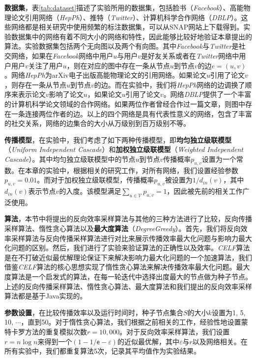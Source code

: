 \textbf{数据集}，表\ref{tab:dataset}描述了实验所用的数据集，包括脸书（\textit{Facebook}）、高能物理论文引用网络（\textit{HepPh}）、推特（\textit{Twitter}）、计算机科学合作网络（\textit{DBLP}）。这些网络都是相关研究中使用频繁的标注数据集，可以从SNAP网站上下载得到。实验数据集中的网络有着不同大小的网络和特性，因此能够比较好地验证本章提出的算法。实验数据集包括两个无向图以及两个有向图。其中\textit{Facebook}与\textit{Twitter}是社交网络，如果在\textit{Facebook}网络中用户$u$与用户$v$是好友关系或者在\textit{Twitter}网络中用户用户$v$关注了用户$u$，则在对应的图中存在一条从节点$u$到节点$v$的边$e=(u,v)$。网络\textit{HepPh}为arXiv电子出版高能物理论文的引用网络。如果论文$u$引用了论文$v$，则存在一条从节点$u$到节点$v$的边。而在实验中，我们将\textit{HepPh}网络的边调换了顺序来表示论文$v$影响了论文$u$，如果论文$u$引用了论文$v$。网络\textit{DBLP}提供了一个丰富的计算机科学论文领域的合作网络。如果两位作者曾经合作过一篇文章，则图中存在一条连接两位作者的边。以上的四个网络是具有代表性意义的网络，包含了丰富的社交关系，网络的边集合的大小从万级别到百万级别不等。

\textbf{传播模型}，在实验中，我们考虑了如下两种传播模型，即\textbf{均匀独立级联模型}（\textit{Uniform Independent Cascade}）和\textbf{加权独立级联模型}（\textit{Weighted Independent Cascade}）。其中均匀独立级联模型中的节点$u$到节点$v$传播概率$p_{u,v}$设置为一个常数。在本章的实验中，根据相关的研究工作，对所有网络，我们设置经验参数$p_{u,v}=0.01$。而对于加权独立级联模型，传播概率$p_{u,v}$被设置为$1 / d_{in}\left(v\right)$，其中$d_{in}\left(v\right)$表示节点$v$的入度。该模型满足$\sum_{u \in \mathcal{V}}{p_{u,v}} = 1$，因此被先前的相关工作广泛使用。

\textbf{算法}，本节中将提出的反向效率采样算法与其他的三种方法进行了比较，反向传播采样算法、惰性贪心算法以及\textbf{最大度算法}（\textit{DegreeGreedy}）。首先，我们将反向效率采样算法与反向传播采样算法进行对比来展示传播效率最大化问题与影响力最大化问题的区别。然后，我们进行了实验来验证算法的正确性以及效率。\textit{CELF}算法是在不打破近似最优解理论保证下来解决影响力最大化问题的一个加速算法，我们借鉴\textit{CELF}算法的核心思想实现了惰性贪心算法来解决传播效率最大化问题。最大度算法是一个启发式的算法，在每一轮迭代中选择出度最大的节点做为种子节点。上述的反向传播采样算法、惰性贪心算法、最大度算法和我们提出的反向效率采样算法都是基于Java实现的。

\textbf{参数设置}，在比较传播效率以及运行时间时，种子节点集合$S$的大小$k$设置为1, 5, 10,
$\cdots$，直到50。对于惰性贪心算法，我们根据之前相关的工作，经验性地设置蒙特卡罗方法的重复模拟次数$r=10,000$。对于反向效率采样算法，我们设置$r=n\log{n}$来得到一个$(1-1/\mathsf{e}-\varepsilon)$的近似最优解，其中$\varepsilon$与$r$以及网络相关。在所有实验中，我们都重复算法5次，记录其平均值作为实验结果。

